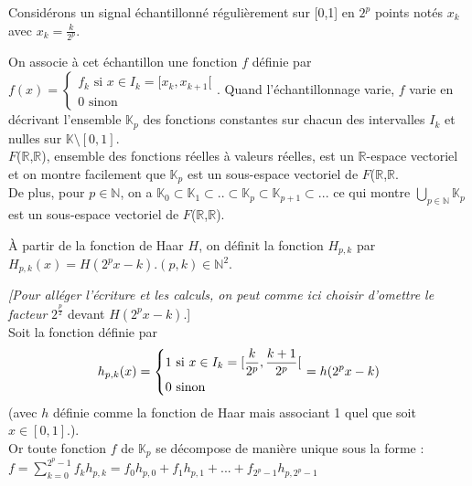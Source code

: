 \documentclass{article}
\begin{document}
Considérons un signal échantillonné régulièrement sur [0,1] en $2^p$ points notés $x_{k}$ avec $x_{k} = \frac{k}{2^p}$.

On associe à cet échantillon une fonction $f$ définie par $f(x) = \begin{cases}
     f_{k} \text{ si } x \in I_{k} = [x_{k},x_{k+1}[\\
     0 \text{ sinon }
   \end{cases}$.
Quand l'échantillonnage varie, $f$ varie en décrivant l'ensemble $\mathbb{K}_{p}$ des fonctions constantes sur chacun des intervalles $I_{k}$ et nulles sur $\mathbb{K} \setminus [0,1]$. \\

$F$($\mathbb{R}$,$\mathbb{R}$), ensemble des fonctions réelles à valeurs réelles, est un $\mathbb{R}$-espace vectoriel et on montre facilement que $\mathbb{K}_{p}$ est un sous-espace vectoriel de $F$($\mathbb{R}$,$\mathbb{R}$. \\

De plus, pour $p \in \mathbb{N}$, on a $\mathbb{K}_{0} \subset \mathbb{K}_{1} \subset .. \subset \mathbb{K}_{p} \subset \mathbb{K}_{p+1} \subset ... $ ce qui montre $\bigcup\limits_{p \in \mathbb{N}}\mathbb{K}_{p}$ est un sous-espace vectoriel de $F$($\mathbb{R}$,$\mathbb{R}$).

\uppercase{à} partir de la fonction de Haar $H$, on définit la fonction $H_{p,k}$ par $H_{p,k}(x) = H(2^{p}x - k). (p,k) \in \mathbb{N}^2$.

\textit{[Pour alléger l’écriture et les calculs, on peut comme ici choisir d’omettre le facteur }$2^\frac{p}{2}$ devant $ H(2^{p}x - k)$.] \\

Soit la fonction définie par \[
 h_{p,k}(x) = \begin{dcases*}
        1 \text{ si } x \in I_{k} = [ \frac{k}{2^p},\frac{k+1}{2^p}[ \\ 
        0 \text{ sinon }
        \end{dcases*}
 = h(2^{p}x - k) \] (avec $h$ définie comme la fonction de Haar mais associant 1 quel que soit $x \in [0,1]$.). \\

Or toute fonction $f$ de $\mathbb{K}_{p}$ se décompose de manière unique sous la forme : \\

$\displaystyle f = \sum_{k = 0}^{2^p - 1} f_{k}h_{p,k} = f_{0}h_{p,0} + f_{1}h_{p,1} + ... + f_{2^p - 1}h_{p,2^p - 1}$ \\
\end{document}
